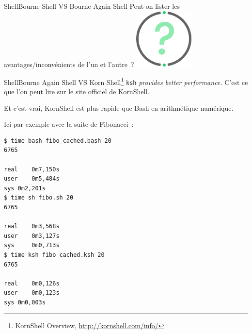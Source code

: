 \documentclass{beamer}
\begin{document}
    \begin{frame}{Shell}{Bourne Shell VS Bourne Again Shell}
        Peut-on lister les avantages/inconvénients de l'un et l'autre~?
        \bigbreak
        \centering
        \includegraphics[width=3cm]{image/question-mark}
    \end{frame}

    \begin{frame}[fragile]{Shell}{Bourne Again Shell VS Korn Shell\footnote{KornShell Overview, \url{http://kornshell.com/info/}}}
        \lstinline{ksh}\textit{ provides better performance.} C'est ce que l'on peut lire sur le site officiel de KornShell.

        Et c'est vrai, KornShell est plus rapide que Bash en arithmétique numérique.

        Ici par exemple avec la suite de Fibonacci~:
        \begin{lstlisting}[language=bash,basicstyle=\tiny\ttfamily]
$ time bash fibo_cached.bash 20
6765

real	0m7,150s
user	0m5,484s
sys	0m2,201s
$ time sh fibo.sh 20
6765

real    0m3,568s
user    0m3,127s
sys     0m0,713s
$ time ksh fibo_cached.ksh 20
6765

real	0m0,126s
user	0m0,123s
sys	0m0,003s
        \end{lstlisting}
    \end{frame}
\end{document}
